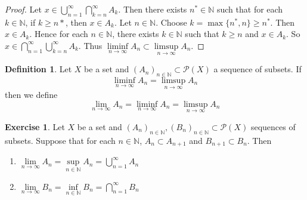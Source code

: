 \documentclass{book}
\theoremstyle{definition}
\newtheorem{defn}[definition]{Definition}
\newtheorem{ex}[definition]{Exercise}
\newcommand{\N}{\mathbb{N}}
\newcommand{\MP}{\mathcal{P}}
\newcommand{\lex}[1]{\label{ex:#1}}
\newcommand{\ld}[1]{\label{defn:#1}}
\DeclareMathOperator*{\0}{\mbf{0}}
\DeclareMathOperator*{\1}{\mbf{1}}
\newcommand{\limn}{\lim \limits_{n \rightarrow \infty}}
\begin{document}
	\begin{proof}
		Let $x \in \bigcup\limits_{n=1}^{\infty} \bigcap\limits_{k =n}^{\infty} A_k$. Then there exists $n^* \in \N$ such that for each $k \in \N$, if $k \geq n*$, then $x \in A_k$. Let $n \in \N$. Choose $k = \max\{n^*,n\} \geq n^*$. Then $x \in A_k$. Hence for each $n \in \N$, there exists $k \in \N$ such that $k \geq n$ and $x \in A_k$. So $x \in \bigcap\limits_{n=1}^{\infty} \bigcup\limits_{k=n}^{\infty} A_k$. Thus $\liminf\limits_{n \rightarrow \infty}A_n \subset \limsup\limits_{n \rightarrow \infty}A_n$.
	\end{proof}
	
	\begin{defn} \ld{00000} 
		Let $X$ be a set and $(A_n)_{n \in \N} \subset \MP(X)$ a sequence of subsets. If $$\liminf_{n \rightarrow \infty} A_n = \limsup_{n \rightarrow \infty} A_n$$ then we define $$\lim_{n \rightarrow \infty}A_n = \liminf_{n \rightarrow \infty} A_n = \limsup_{n \rightarrow \infty} A_n$$ 
	\end{defn}
	
	\begin{ex} \lex{00000} 
		Let $X$ be a set and $(A_n)_{n \in \N}, (B_n)_{n \in \N} \subset \MP(X)$ sequences of subsets. Suppose that for each $n \in \N$, $A_n \subset A_{n+1}$ and $B_{n+1} \subset B_n$. Then 
		\begin{enumerate}
			\item $\limn A_n = \sup\limits_{n \in \N}A_n = \bigcup\limits_{n=1}^{\infty}A_n$
			\item $\limn B_n = \inf\limits_{n \in \N}B_n = \bigcap\limits_{n=1}^{\infty}B_n$
		\end{enumerate}
	\end{ex}
	
\end{document}
